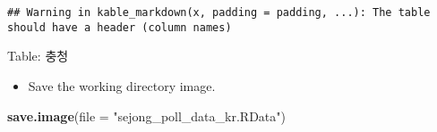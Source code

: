 \documentclass[
]{article}
\newenvironment{Shaded}{\begin{snugshade}}{\end{snugshade}}
\newcommand{\DataTypeTok}[1]{\textcolor[rgb]{0.13,0.29,0.53}{#1}}
\newcommand{\KeywordTok}[1]{\textcolor[rgb]{0.13,0.29,0.53}{\textbf{#1}}}
\newcommand{\NormalTok}[1]{#1}
\newcommand{\StringTok}[1]{\textcolor[rgb]{0.31,0.60,0.02}{#1}}
\providecommand{\tightlist}{%
  \setlength{\itemsep}{0pt}\setlength{\parskip}{0pt}}
\begin{document}
\begin{verbatim}
## Warning in kable_markdown(x, padding = padding, ...): The table should have a header (column names)
\end{verbatim}

Table: 충청

\textbar\textbar{} \textbar\textbar{} \textbar\textbar{}
\textbar\textbar{}

\begin{itemize}
\tightlist
\item
  Save the working directory image.
\end{itemize}

\begin{Shaded}
\begin{Highlighting}[]
\KeywordTok{save.image}\NormalTok{(}\DataTypeTok{file =} \StringTok{"sejong\_poll\_data\_kr.RData"}\NormalTok{)}
\end{Highlighting}
\end{Shaded}
\end{document}
